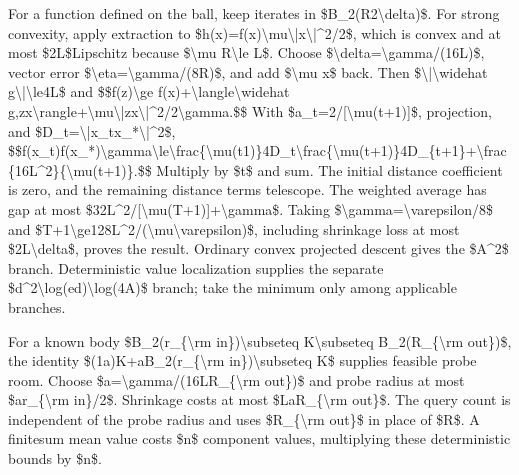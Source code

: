 \documentclass[10pt,a4paper]{article}
\begin{document}
For a function defined on the ball, keep iterates in \$B\_2(R2\textbackslash{}delta)\$. For strong convexity, apply extraction to \$h(x)=f(x)\textbackslash{}mu\textbackslash{}|x\textbackslash{}|\textasciicircum{}2/2\$, which is convex and at most \$2L\$Lipschitz because \$\textbackslash{}mu R\textbackslash{}le L\$. Choose \$\textbackslash{}delta=\textbackslash{}gamma/(16L)\$, vector error \$\textbackslash{}eta=\textbackslash{}gamma/(8R)\$, and add \$\textbackslash{}mu x\$ back. Then \$\textbackslash{}|\textbackslash{}widehat g\textbackslash{}|\textbackslash{}le4L\$ and
\$\$f(z)\textbackslash{}ge f(x)+\textbackslash{}langle\textbackslash{}widehat g,zx\textbackslash{}rangle+\textbackslash{}mu\textbackslash{}|zx\textbackslash{}|\textasciicircum{}2/2\textbackslash{}gamma.\$\$
With \$a\_t=2/[\textbackslash{}mu(t+1)]\$, projection, and \$D\_t=\textbackslash{}|x\_tx\_*\textbackslash{}|\textasciicircum{}2\$,
\$\$f(x\_t)f(x\_*)\textbackslash{}gamma\textbackslash{}l\allowbreak{}e\textbackslash{}frac\{\textbackslash{}mu(t1)\}4D\_t\textbackslash{}fr\allowbreak{}ac\{\textbackslash{}mu(t+1)\}4D\_\{t+1\}+\textbackslash{}fr\allowbreak{}ac\{16L\textasciicircum{}2\}\{\textbackslash{}mu(t+1)\}.\$\$
Multiply by \$t\$ and sum. The initial distance coefficient is zero, and the remaining distance terms telescope. The weighted average has gap at most \$32L\textasciicircum{}2/[\textbackslash{}mu(T+1)]+\textbackslash{}gamma\$. Taking \$\textbackslash{}gamma=\textbackslash{}varepsilon/8\$ and \$T+1\textbackslash{}ge128L\textasciicircum{}2/(\textbackslash{}mu\textbackslash{}varepsilon)\$, including shrinkage loss at most \$2L\textbackslash{}delta\$, proves the result. Ordinary convex projected descent gives the \$A\textasciicircum{}2\$ branch. Deterministic value localization supplies the separate \$d\textasciicircum{}2\textbackslash{}log(ed)\textbackslash{}log(4A)\$ branch; take the minimum only among applicable branches.

For a known body \$B\_2(r\_\{\textbackslash{}rm in\})\textbackslash{}subseteq K\textbackslash{}subseteq B\_2(R\_\{\textbackslash{}rm out\})\$, the identity \$(1a)K+aB\_2(r\_\{\textbackslash{}rm in\})\textbackslash{}subseteq K\$ supplies feasible probe room. Choose \$a=\textbackslash{}gamma/(16LR\_\{\textbackslash{}rm out\})\$ and probe radius at most \$ar\_\{\textbackslash{}rm in\}/2\$. Shrinkage costs at most \$LaR\_\{\textbackslash{}rm out\}\$. The query count is independent of the probe radius and uses \$R\_\{\textbackslash{}rm out\}\$ in place of \$R\$. A finitesum mean value costs \$n\$ component values, multiplying these deterministic bounds by \$n\$.
\end{document}
